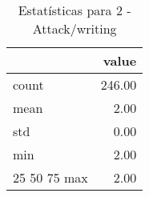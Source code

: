 \begin{table}[htbp]
\caption{Estatísticas para 2 - Attack/writing}
\label{tab:2_-_attack_writing_summary}
\begin{tabular}{lr}
\toprule
 & value \\
\midrule
count & 246.00 \\
mean & 2.00 \\
std & 0.00 \\
min & 2.00 \\
25%
50%
75%
max & 2.00 \\
\bottomrule
\end{tabular}
\end{table}

